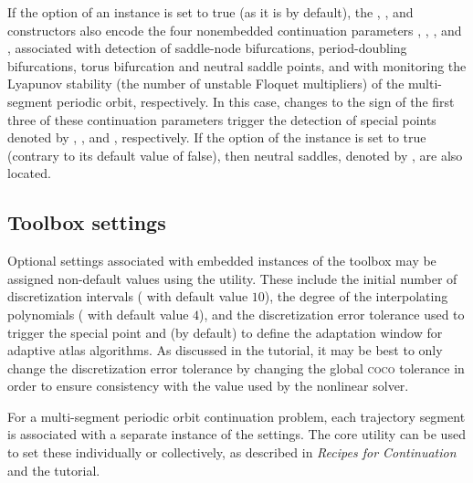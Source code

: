 If the  option of an  instance is set to true (as it is by default), the , , and  constructors also encode the four nonembedded continuation parameters , , , and , associated with detection of saddle-node bifurcations, period-doubling bifurcations, torus bifurcation and neutral saddle points, and with monitoring the Lyapunov stability (the number of unstable Floquet multipliers) of the multi-segment periodic orbit, respectively. In this case, changes to the sign of the first three of these continuation parameters trigger the detection of special points denoted by , , and , respectively. If the  option of the  instance is set to true (contrary to its default value of false), then neutral saddles, denoted by , are also located.

\subsection{Toolbox settings}
Optional settings associated with embedded instances of the  toolbox may be assigned non-default values using the  utility. These include the initial number of discretization intervals ( with default value $10$), the degree of the interpolating polynomials ( with default value $4$), and the discretization error tolerance used to trigger the  special point and (by default) to define the adaptation window for adaptive atlas algorithms. As discussed in the  tutorial, it may be best to only change the discretization error tolerance by changing the global \textsc{coco} tolerance in order to ensure consistency with the value used by the nonlinear solver.

For a multi-segment periodic orbit continuation problem, each trajectory segment is associated with a separate instance of the  settings. The  core utility can be used to set these individually or collectively, as described in \emph{Recipes for Continuation} and the  tutorial.

